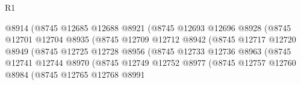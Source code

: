 \begin{lexlean}{R1}
\begin{coremodule}
                                        @8914
                                        (@8745
                                          @12685
                                          @12688
                                          @8921
                                          (@8745
                                            @12693
                                            @12696
                                            @8928
                                            (@8745
                                              @12701
                                              @12704
                                              @8935
                                              (@8745
                                                @12709
                                                @12712
                                                @8942
                                                (@8745
                                                  @12717
                                                  @12720
                                                  @8949
                                                  (@8745
                                                    @12725
                                                    @12728
                                                    @8956
                                                    (@8745
                                                      @12733
                                                      @12736
                                                      @8963
                                                      (@8745
                                                        @12741
                                                        @12744
                                                        @8970
                                                        (@8745
                                                          @12749
                                                          @12752
                                                          @8977
                                                          (@8745
                                                            @12757
                                                            @12760
                                                            @8984
                                                            (@8745
                                                              @12765
                                                              @12768
                                                              @8991

\end{coremodule}
\end{lexlean}
